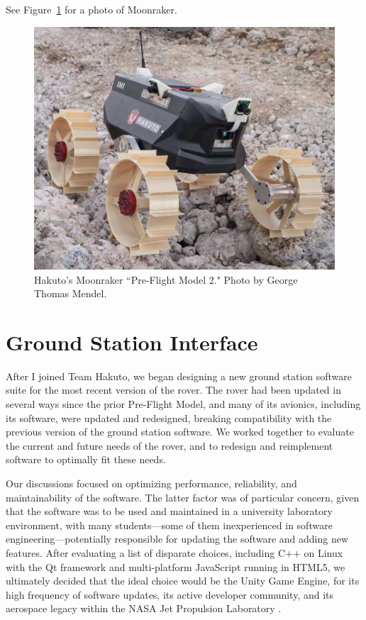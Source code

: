 See Figure~\ref{fig:moonraker} for a photo of Moonraker.

\begin{figure}[h]
\centering
    \includegraphics[width=\columnwidth]{images/moonraker.jpg}
    \caption{Hakuto's Moonraker ``Pre-Flight Model 2." Photo by George Thomas Mendel.}
    \label{fig:moonraker}
\end{figure}

\section{Ground Station Interface}

After I joined Team Hakuto, we began designing a new ground station software suite for the most recent version of the rover. The rover had been updated in several ways since the prior Pre-Flight Model, and many of its avionics, including its software, were updated and redesigned, breaking compatibility with the previous version of the ground station software. We worked together to evaluate the current and future needs of the rover, and to redesign and reimplement software to optimally fit these needs.

Our discussions focused on optimizing performance, reliability, and maintainability of the software. The latter factor was of particular concern, given that the software was to be used and maintained in a university laboratory environment, with many students---some of them inexperienced in software engineering---potentially responsible for updating the software and adding new features. After evaluating a list of disparate choices, including C++ on Linux with the Qt framework and multi-platform JavaScript running in HTML5, we ultimately decided that the ideal choice would be the Unity Game Engine, for its high frequency of software updates, its active developer community, and its aerospace legacy within the NASA Jet Propulsion Laboratory \cite{jplunity}. 

